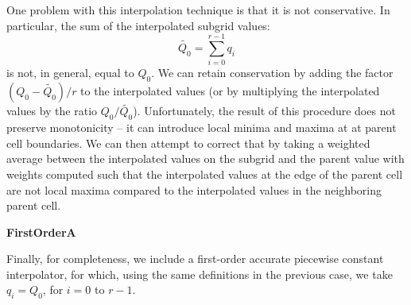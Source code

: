 One problem with this interpolation technique is that it is not conservative.  In particular, the sum of the interpolated subgrid values:
\begin{equation}
\tilde{Q_0} = \sum_{i=0}^{r-1} q_i
\end{equation}
is not, in general, equal to $Q_0$.  We can retain conservation by adding the factor $(Q_0 - \tilde{Q_0})/r$ to the interpolated values (or by multiplying the interpolated values by the ratio $Q_0/\tilde{Q_0}$).  Unfortunately, the result of this procedure does not preserve monotonicity -- it can introduce local minima and maxima at at parent cell boundaries.  We can then attempt to correct that by taking a weighted average between the interpolated values on the subgrid and the parent value with weights computed such that the interpolated values at the edge of the parent cell are not local maxima compared to the interpolated values in the neighboring parent cell.


\vspace{0.3cm}\noindent
{\bf FirstOrderA}

Finally, for completeness, we include a first-order accurate piecewise constant interpolator, for which, using the same definitions in the previous case, we take $q_i = Q_0$, for $i = 0$ to $r-1$. 

\vspace{1cm}

